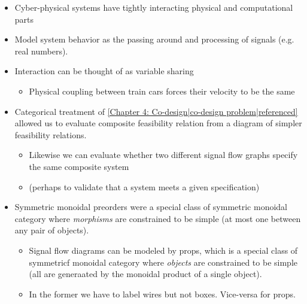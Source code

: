 \begin{itemize}
    \item Cyber-physical systems have tightly interacting physical and computational parts
    \item Model system behavior as the passing around and processing of signals (e.g. real numbers).
    \item Interaction can be thought of as variable sharing
          \begin{itemize}
            \item Physical coupling between train cars forces their velocity to be the same
          \end{itemize}
    \item Categorical treatment of \ref{Chapter 4: Co-design|co-design problem|referenced} allowed us to evaluate composite feasibility relation from a diagram of simpler feasibility relations.
          \begin{itemize}
            \item Likewise we can evaluate whether two different signal flow graphs specify the same composite system
            \item (perhaps to validate that a system meets a given specification)
          \end{itemize}
    \item Symmetric monoidal preorders were a special class of symmetric monoidal category where \emph{morphisms} are constrained to be simple (at most one between any pair of objects).
          \begin{itemize}
            \item Signal flow diagrams can be modeled by props, which is a special class of symmetricf monoidal category where \emph{objects} are constrained to be simple (all are generaated by the monoidal product of a single object).
            \item In the former we have to label wires but not boxes. Vice-versa for props.
          \end{itemize}
  \end{itemize}
